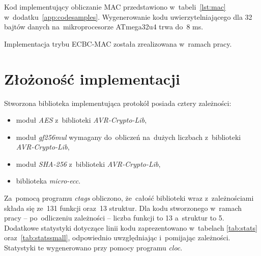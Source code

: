 Kod implementujący obliczanie MAC przedstawiono w~tabeli~\ref{lst:mac} w~dodatku~\ref{app:codesamples}. Wygenerowanie kodu uwierzytelniającego dla 32 bajtów danych na~mikroprocesorze ATmega32u4 trwa do~8 ms.

Implementacja trybu ECBC-MAC została zrealizowana w~ramach pracy.

\section{Złożoność implementacji}
\label{cha:complexity}

\FloatBarrier

Stworzona biblioteka implementująca protokół posiada cztery zależności:

\begin{itemize}
    \item moduł \emph{AES} z~biblioteki \emph{AVR-Crypto-Lib},
    \item moduł \emph{gf256mul} wymagany do~obliczeń na~dużych liczbach z~biblioteki \emph{AVR-Crypto-Lib},
    \item moduł \emph{SHA-256} z~biblioteki \emph{AVR-Crypto-Lib},
    \item biblioteka \emph{micro-ecc}.
\end{itemize}

Za~pomocą programu \emph{ctags} obliczono, że~całość biblioteki wraz z~zależnościami składa się ze~131 funkcji oraz~13 struktur. Dla kodu stworzonego w~ramach pracy -- po~odliczeniu zależności -- liczba funkcji to 13 a~struktur to 5. Dodatkowe statystyki dotyczące linii kodu zaprezentowano w~tabelach \ref{tab:stats} oraz~\ref{tab:statssmall}, odpowiednio uwzględniając i~pomijając zależności. Statystyki te wygenerowano przy pomocy programu \emph{cloc}.

